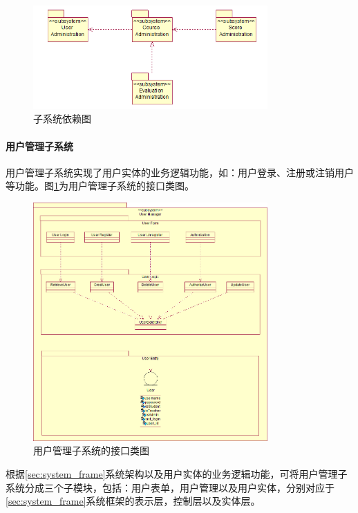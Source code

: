 \begin{figure}[H]
  \centering
  \includegraphics[width=0.8\textwidth]{img/subsystem_depend}
  \caption{子系统依赖图}
\end{figure}

\paragraph{用户管理子系统}
  
用户管理子系统实现了用户实体的业务逻辑功能，如：用户登录、注册或注销用户等功能。图\ref{fig:subsystem_usermanage_interface}为用户管理子系统的接口类图。
\begin{figure}[t]
  \centering
  \includegraphics[width=0.8\textwidth]{img/usermgr_interface}
  \caption{用户管理子系统的接口类图}
  \label{fig:subsystem_usermanage_interface}
\end{figure}
  
根据\ref{sec:system_frame}系统架构以及用户实体的业务逻辑功能，可将用户管理子系统分成三个子模块，包括：用户表单，用户管理以及用户实体，分别对应于\ref{sec:system_frame}系统框架的表示层，控制层以及实体层。
  
